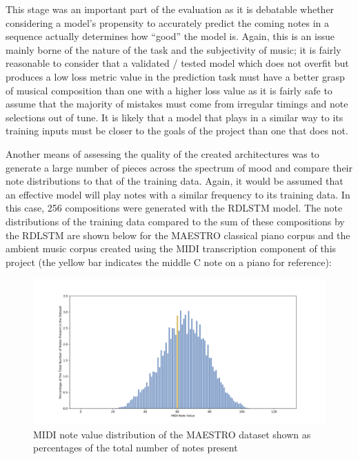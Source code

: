 \documentclass[12pt,]{article}
\begin{document}
This stage was an important part of the evaluation as it is debatable
whether considering a model's propensity to accurately predict the
coming notes in a sequence actually determines how ``good'' the model
is. Again, this is an issue mainly borne of the nature of the task and
the subjectivity of music; it is fairly reasonable to consider that a
validated / tested model which does not overfit but produces a low loss
metric value in the prediction task must have a better grasp of musical
composition than one with a higher loss value as it is fairly safe to
assume that the majority of mistakes must come from irregular timings
and note selections out of tune. It is likely that a model that plays in
a similar way to its training inputs must be closer to the goals of the
project than one that does not.

Another means of assessing the quality of the created architectures was
to generate a large number of pieces across the spectrum of mood and
compare their note distributions to that of the training data. Again, it
would be assumed that an effective model will play notes with a similar
frequency to its training data. In this case, 256 compositions were
generated with the RDLSTM model. The note distributions of the training
data compared to the sum of these compositions by the RDLSTM are shown
below for the MAESTRO classical piano corpus and the ambient music
corpus created using the MIDI transcription component of this project
(the yellow bar indicates the middle C note on a piano for reference):

\begin{figure}
\centering
\includegraphics{Images/classicnotedistrib.png}
\caption{MIDI note value distribution of the MAESTRO dataset shown as
percentages of the total number of notes present}
\end{figure}
\end{document}
